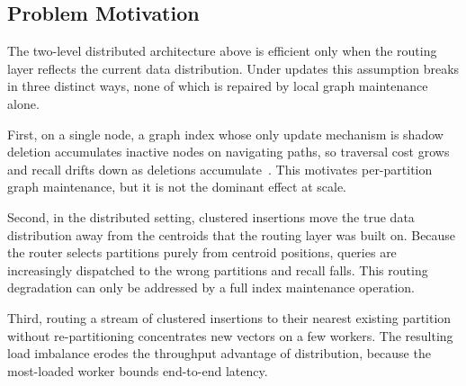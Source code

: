 \documentclass[sigconf,review,anonymous]{acmart}
\begin{document}

\subsection{Problem Motivation}
\label{sec:motivation}
    The two-level distributed architecture above is efficient only when the routing layer reflects the current data distribution. Under updates this assumption breaks in three distinct ways, none of which is repaired by local graph maintenance alone.

    First, on a single node, a graph index whose only update mechanism is shadow deletion accumulates inactive nodes on navigating paths, so traversal cost grows and recall drifts down as deletions accumulate~\cite{singh2021freshdiskann, yu2025topology}. This motivates per-partition graph maintenance, but it is not the dominant effect at scale.

    Second, in the distributed setting, clustered insertions move the true data distribution away from the centroids that the routing layer was built on. Because the router selects partitions purely from centroid positions, queries are increasingly dispatched to the wrong partitions and recall falls. This routing degradation can only be addressed by a full index maintenance operation.

    Third, routing a stream of clustered insertions to their nearest existing partition without re-partitioning concentrates new vectors on a few workers. The resulting load imbalance erodes the throughput advantage of distribution, because the most-loaded worker bounds end-to-end latency.
\end{document}
